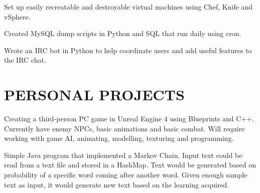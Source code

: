 \documentclass[letterpaper]{deedy-resume-modified} %
\begin{document}
\begin{minipage}[t]{0.66\textwidth}
\sectionspace %
\vspace{-10pt}



\begin{tightitemize}
\item Set up easily recreatable and destroyable virtual machines using Chef, Knife and vSphere.
\item Created MySQL dump scripts in Python and SQL that run daily using cron.
\item Wrote an IRC bot in Python to help coordinate users and add useful features to the IRC chat.
\end{tightitemize}

\sectionspace %


\section{PERSONAL PROJECTS}


Creating a third-person PC game in Unreal Engine 4 using Blueprints and C++.  Currently have enemy NPCs, basic animations and basic combat.  Will require working with game AI, animating, modelling, texturing and programming.  

\sectionspace %



Simple Java program that implemented a Markov Chain.  Input text could be read from a text file and stored in a HashMap.  Text would be generated based on probability of a specific word coming after another word.  Given enough sample text as input, it would generate new text based on the learning acquired.

\sectionspace %


\end{minipage}
\end{document}
